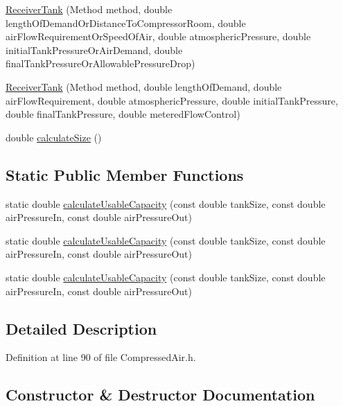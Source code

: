 \begin{DoxyCompactItemize}
\item 
\hyperlink{class_receiver_tank_a499e102ca118bfe3bdff3584310207c2}{Receiver\+Tank} (Method method, double length\+Of\+Demand\+Or\+Distance\+To\+Compressor\+Room, double air\+Flow\+Requirement\+Or\+Speed\+Of\+Air, double atmospheric\+Pressure, double initial\+Tank\+Pressure\+Or\+Air\+Demand, double final\+Tank\+Pressure\+Or\+Allowable\+Pressure\+Drop)
\item 
\hyperlink{class_receiver_tank_aba0ca17714d1009c79d6dfcfaa3cea6a}{Receiver\+Tank} (Method method, double length\+Of\+Demand, double air\+Flow\+Requirement, double atmospheric\+Pressure, double initial\+Tank\+Pressure, double final\+Tank\+Pressure, double metered\+Flow\+Control)
\item 
double \hyperlink{class_receiver_tank_a5841344b63c444e4ceb9c3b7daeaf613}{calculate\+Size} ()
\end{DoxyCompactItemize}
\subsection*{Static Public Member Functions}
\begin{DoxyCompactItemize}
\item 
static double \hyperlink{class_receiver_tank_ad17f86b7de728d4796ee5b9663dcc577}{calculate\+Usable\+Capacity} (const double tank\+Size, const double air\+Pressure\+In, const double air\+Pressure\+Out)
\item 
static double \hyperlink{class_receiver_tank_ad17f86b7de728d4796ee5b9663dcc577}{calculate\+Usable\+Capacity} (const double tank\+Size, const double air\+Pressure\+In, const double air\+Pressure\+Out)
\item 
static double \hyperlink{class_receiver_tank_ad17f86b7de728d4796ee5b9663dcc577}{calculate\+Usable\+Capacity} (const double tank\+Size, const double air\+Pressure\+In, const double air\+Pressure\+Out)
\end{DoxyCompactItemize}


\subsection{Detailed Description}


Definition at line 90 of file Compressed\+Air.\+h.



\subsection{Constructor \& Destructor Documentation}
\mbox{\label{class_receiver_tank_ad41df65fb570224e135eae7b16c15b81}} 
